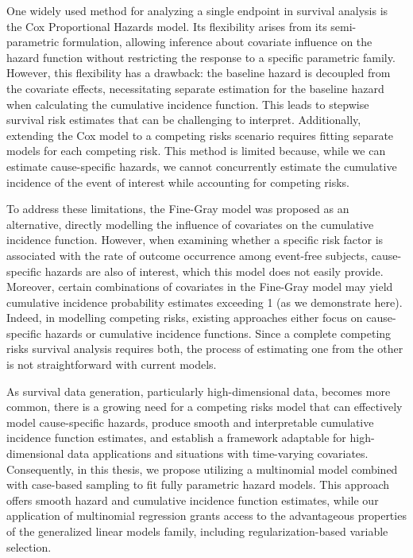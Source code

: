 \documentclass[AMA,Times1COL]{WileyNJDv5} %
\begin{document}
One widely used method for analyzing a single endpoint in survival analysis is the Cox Proportional Hazards model. Its flexibility arises from its semi-parametric formulation, allowing inference about covariate influence on the hazard function without restricting the response to a specific parametric family. However, this flexibility has a drawback: the baseline hazard is decoupled from the covariate effects, necessitating separate estimation for the baseline hazard when calculating the cumulative incidence function. This leads to stepwise survival risk estimates that can be challenging to interpret. Additionally, extending the Cox model to a competing risks scenario requires fitting separate models for each competing risk. This method is limited because, while we can estimate cause-specific hazards, we cannot concurrently estimate the cumulative incidence of the event of interest while accounting for competing risks.

To address these limitations, the Fine-Gray model was proposed as an alternative, directly modelling the influence of covariates on the cumulative incidence function. However, when examining whether a specific risk factor is associated with the rate of outcome occurrence among event-free subjects, cause-specific hazards are also of interest, which this model does not easily provide. Moreover, certain combinations of covariates in the Fine-Gray model may yield cumulative incidence probability estimates exceeding 1 (as we demonstrate here). Indeed, in modelling competing risks, existing approaches either focus on cause-specific hazards or cumulative incidence functions. Since a complete competing risks survival analysis requires both, the process of estimating one from the other is not straightforward with current models.

As survival data generation, particularly high-dimensional data, becomes more common, there is a growing need for a competing risks model that can effectively model cause-specific hazards, produce smooth and interpretable cumulative incidence function estimates, and establish a framework adaptable for high-dimensional data applications and situations with time-varying covariates. Consequently, in this thesis, we propose utilizing a multinomial model combined with case-based sampling to fit fully parametric hazard models. This approach offers smooth hazard and cumulative incidence function estimates, while our application of multinomial regression grants access to the advantageous properties of the generalized linear models family, including regularization-based variable selection.
\end{document}
